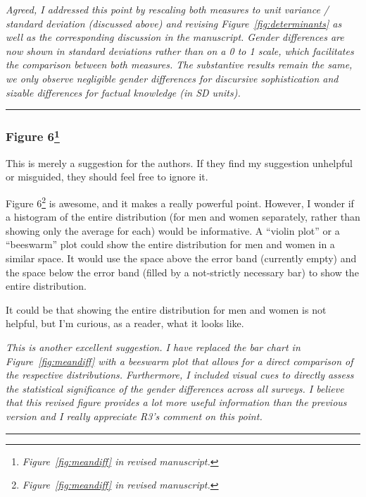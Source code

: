 \textit{Agreed, I addressed this point by rescaling both measures to unit variance / standard deviation (discussed above) and revising Figure~\ref{fig:determinants} as well as the corresponding discussion in the manuscript. Gender differences are now shown in standard deviations rather than on a 0 to 1 scale, which facilitates the comparison between both measures. The substantive results remain the same, we only observe negligible gender differences for discursive sophistication and sizable differences for factual knowledge (in SD units).}


\rule{\linewidth}{.01cm}


\subsubsection*{Figure 6\footnote{\textit{Figure~\ref{fig:meandiff} in revised manuscript.}}}

This is merely a suggestion for the authors. If they find my suggestion unhelpful or misguided, they should feel free to ignore it.

Figure 6\footnote{\textit{Figure~\ref{fig:meandiff} in revised manuscript.}} is awesome, and it makes a really powerful point. However, I wonder if a histogram of the entire distribution (for men and women separately, rather than showing only the average for each) would be informative. A ``violin plot'' or a ``beeswarm'' plot could show the entire distribution for men and women in a similar space. It would use the space above the error band (currently empty) and the space below the error band (filled by a not-strictly necessary bar) to show the entire distribution.

It could be that showing the entire distribution for men and women is not helpful, but I’m curious, as a reader, what it looks like.

\textit{This is another excellent suggestion. I have replaced the bar chart in Figure~\ref{fig:meandiff} with a beeswarm plot that allows for a direct comparison of the respective distributions. Furthermore, I included visual cues to directly assess the statistical significance of the gender differences across all surveys. I believe that this revised figure provides a lot more useful information than the previous version and I really appreciate R3's comment on this point.}


\rule{\linewidth}{.01cm}